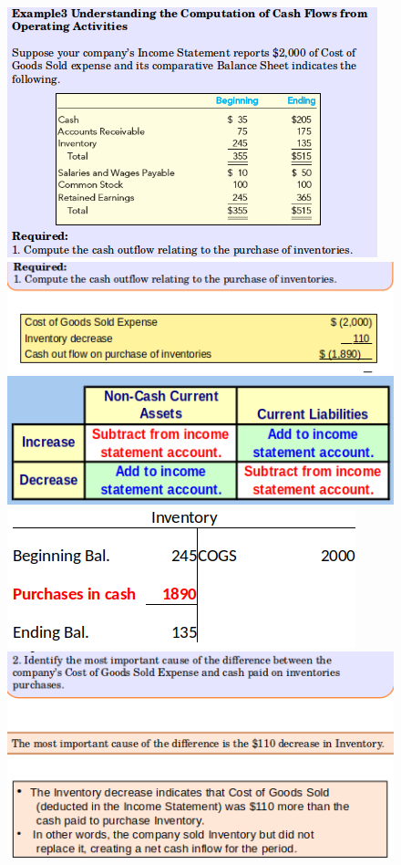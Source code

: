 \documentclass[../main.tex]{subfiles}
\begin{document}
	\begin{figure}[ht!]
		\centering
		\includegraphics[width=0.95\columnwidth]{images/c11/cash_flows_eg3_p1.png}
		\includegraphics[width=0.95\columnwidth]{images/c11/cash_flows_eg3_p2.png}
		\includegraphics[width=0.60\columnwidth]{images/c11/cash_flow_eg3_p3.png}
		\includegraphics[width=0.95\columnwidth]{images/c11/cash_flows_eg3_p4.png}

\end{figure}
\end{document}
